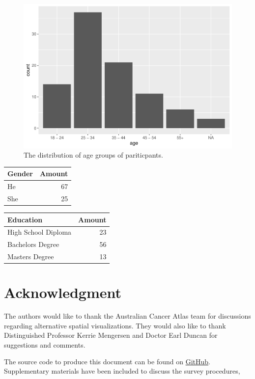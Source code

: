 \documentclass[conference,final,]{IEEEtran}
\makeatletter
\def\maxwidth{\ifdim\Gin@nat@width>\linewidth\linewidth
\else\Gin@nat@width\fi}
\let\Oldincludegraphics\includegraphics
\renewcommand{\includegraphics}[1]{\Oldincludegraphics[width=\maxwidth]{#1}}
\makeatother
\begin{document}
\begin{figure}
\centering
\includegraphics{paper_files/figure-latex/demogs-1.pdf}
\caption{\label{fig:demogs}The distribution of age groups of pariticpants.}
\end{figure}

\begin{tabular}{lr}
\toprule
Gender & Amount\\
\midrule
He & 67\\
She & 25\\
\bottomrule
\end{tabular}

\begin{tabular}{lr}
\toprule
Education & Amount\\
\midrule
High School Diploma & 23\\
Bachelors Degree & 56\\
Masters Degree & 13\\
\bottomrule
\end{tabular}

\hypertarget{acknowledgment-1}{%
\section{Acknowledgment}\label{acknowledgment-1}}

The authors would like to thank the Australian Cancer Atlas team for discussions regarding alternative spatial visualizations. They would also like to thank Distinguished Professor Kerrie Mengersen and Doctor Earl Duncan for suggestions and comments.

The source code to produce this document can be found on \href{https://github.com/srkobakian/experiment/tree/master/paper}{GitHub}.
Supplementary materials have been included to discuss the survey procedures,
\end{document}
